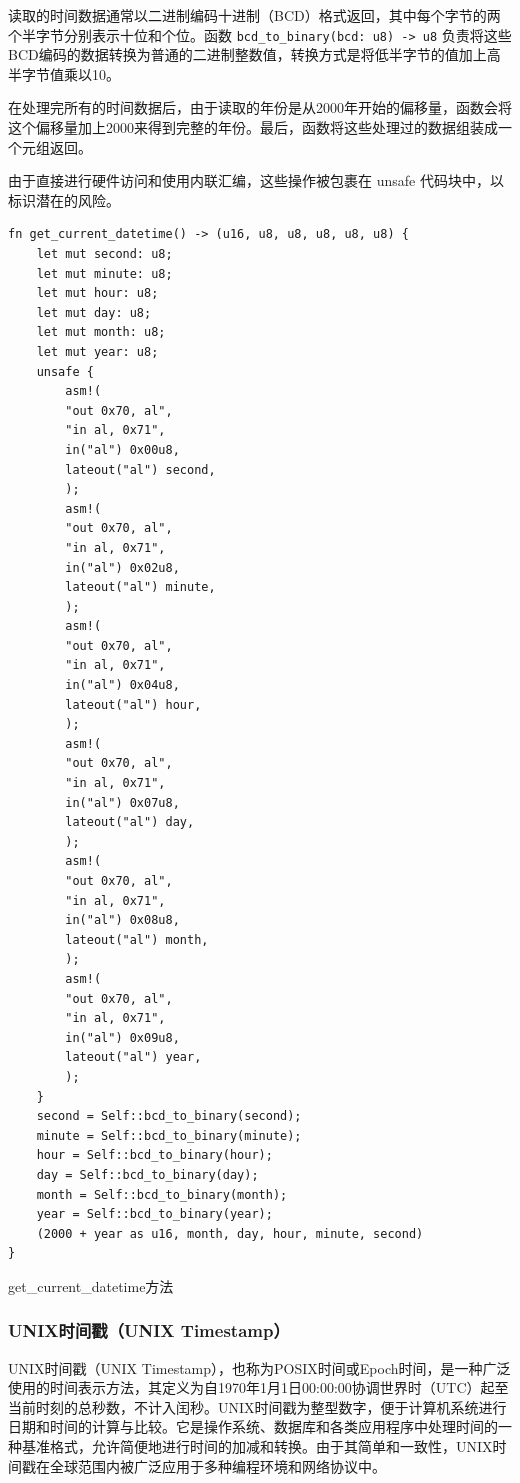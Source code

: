 读取的时间数据通常以二进制编码十进制（BCD）格式返回，其中每个字节的两个半字节分别表示十位和个位。函数 \texttt{bcd\_to\_binary(bcd: u8) -> u8} 负责将这些BCD编码的数据转换为普通的二进制整数值，转换方式是将低半字节的值加上高半字节值乘以10。

在处理完所有的时间数据后，由于读取的年份是从2000年开始的偏移量，函数会将这个偏移量加上2000来得到完整的年份。最后，函数将这些处理过的数据组装成一个元组返回。

由于直接进行硬件访问和使用内联汇编，这些操作被包裹在 unsafe 代码块中，以标识潜在的风险。

\begin{listing}[htbp]
    \begin{verbatim}
fn get_current_datetime() -> (u16, u8, u8, u8, u8, u8) {
    let mut second: u8;
    let mut minute: u8;
    let mut hour: u8;
    let mut day: u8;
    let mut month: u8;
    let mut year: u8;
    unsafe {
        asm!(
        "out 0x70, al",
        "in al, 0x71",
        in("al") 0x00u8,
        lateout("al") second,
        );
        asm!(
        "out 0x70, al",
        "in al, 0x71",
        in("al") 0x02u8,
        lateout("al") minute,
        );
        asm!(
        "out 0x70, al",
        "in al, 0x71",
        in("al") 0x04u8,
        lateout("al") hour,
        );
        asm!(
        "out 0x70, al",
        "in al, 0x71",
        in("al") 0x07u8,
        lateout("al") day,
        );
        asm!(
        "out 0x70, al",
        "in al, 0x71",
        in("al") 0x08u8,
        lateout("al") month,
        );
        asm!(
        "out 0x70, al",
        "in al, 0x71",
        in("al") 0x09u8,
        lateout("al") year,
        );
    }
    second = Self::bcd_to_binary(second);
    minute = Self::bcd_to_binary(minute);
    hour = Self::bcd_to_binary(hour);
    day = Self::bcd_to_binary(day);
    month = Self::bcd_to_binary(month);
    year = Self::bcd_to_binary(year);
    (2000 + year as u16, month, day, hour, minute, second)
}
    \end{verbatim}
    \caption{get\_current\_datetime方法}\label{lst:GetCurrentDatetimeMethod}
\end{listing}

\subsubsection{UNIX时间戳（UNIX Timestamp）}

UNIX时间戳（UNIX Timestamp），也称为POSIX时间或Epoch时间，是一种广泛使用的时间表示方法，其定义为自1970年1月1日00:00:00协调世界时（UTC）起至当前时刻的总秒数，不计入闰秒。UNIX时间戳为整型数字，便于计算机系统进行日期和时间的计算与比较。它是操作系统、数据库和各类应用程序中处理时间的一种基准格式，允许简便地进行时间的加减和转换。由于其简单和一致性，UNIX时间戳在全球范围内被广泛应用于多种编程环境和网络协议中。

